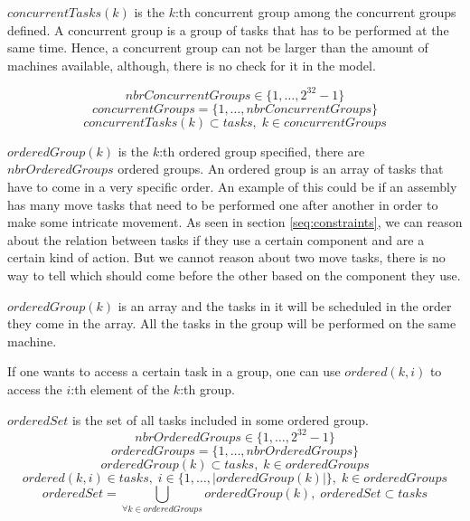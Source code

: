  \noindent $concurrentTasks(k)$ is the $k$:th concurrent group among the concurrent groups defined. A concurrent group is a group of tasks that has to be performed at the same time. Hence, a concurrent group can not be larger than the amount of machines available, although, there is no check for it in the model. 
    
 \begin{equation}\label{eq:8}
 nbrConcurrentGroups \in \{1 , \ldots , 2^{32}-1\}
 \end{equation}
 \begin{equation}\label{eq:17}
 concurrentGroups = \{1 , \ldots , nbrConcurrentGroups\}
 \end{equation}
 \begin{equation}\label{eq:30}
 concurrentTasks(k) \subset tasks, \; k \in concurrentGroups
 \end{equation}

  \noindent $orderedGroup(k)$ is the $k$:th ordered group specified, there are $nbrOrderedGroups$ ordered groups. An ordered group is an array of tasks that have to come in a very specific order. An example of this could be if an assembly has many move tasks that need to be performed one after another in order to make some intricate movement. As seen in section \ref{seq:constraints}, we can reason about the relation between tasks if they use a certain component and are a certain kind of action. But we cannot reason about two move tasks, there is no way to tell which should come before the other based on the component they use. 
  
  $orderedGroup(k)$ is an array and the tasks in it will be scheduled in the order they come in the array. All the tasks in the group will be performed on the same machine.
  
  If one wants to access a certain task in a group, one can use $ordered(k,i)$ to access the $i$:th element of the $k$:th group.
  
  $orderedSet$ is the set of all tasks included in some ordered group.
 \begin{equation}\label{eq:900}
 nbrOrderedGroups \in \{1 , \ldots , 2^{32}-1\}
 \end{equation}
 \begin{equation}\label{eq:9}
 orderedGroups = \{1 , \ldots , nbrOrderedGroups\}
 \end{equation}
 \begin{equation}\label{eq:18}
 orderedGroup(k) \subset tasks, \; k \in orderedGroups
 \end{equation}
 \begin{equation}\label{eq:32}
 ordered(k,i) \in tasks, \; i \in \{1 , \ldots , |orderedGroup(k)|\}, \; k \in orderedGroups
 \end{equation}
 \begin{equation}\label{eq:39}
 orderedSet = \bigcup_{\forall k \in orderedGroups}orderedGroup(k), \; orderedSet \subset tasks
 \end{equation}


